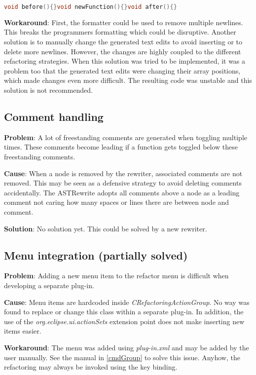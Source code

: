 \begin{lstlisting}[caption={Code without the usual newlines},
label={commentB}, language=C++]
void before(){}void newFunction(){}void after(){}
\end{lstlisting}

\textbf{Workaround}: First, the formatter could be used to remove multiple 
newlines. This breaks the programmers formatting which could be disruptive. 
Another solution is to manually change the generated text edits to avoid 
inserting or to delete more newlines. However, the changes are highly coupled to 
the different refactoring strategies. When this solution was tried to be 
implemented, it was a problem too that the generated text edits were changing 
their array positions, which made changes even more difficult. The resulting 
code was unstable and this solution is not recommended. 

\subsection{Comment handling}
\textbf{Problem}: A lot of freestanding comments are generated when
toggling multiple times. These comments become leading if a function gets
toggled below these freestanding comments.

\textbf{Cause}: When a node is removed by the rewriter, associated comments are 
not removed. This may be seen as a defensive strategy to avoid deleting comments 
accidentally. The ASTRewrite adopts all comments above a node as a leading
comment not caring how many spaces or lines there are between node and comment.

\textbf{Solution}: No solution yet. This could be solved by a new rewriter.

\subsection{Menu integration (partially solved)}
\textbf{Problem}: Adding a new menu item to the refactor menu is difficult when 
developing a separate plug-in.

\textbf{Cause}: Menu items are hardcoded inside
\textit{CRefactoringActionGroup}. No way was found to replace or change this 
class within a separate plug-in. In addition, the use of the 
\textit{org.eclipse.ui.actionSets} extension point does not make inserting new 
items easier.

\textbf{Workaround}: The menu was added using \textit{plug-in.xml} and may be added 
by the user manually. See the manual in \ref{cmdGroup} to solve this issue. 
Anyhow, the refactoring may always be invoked using the key binding. 

